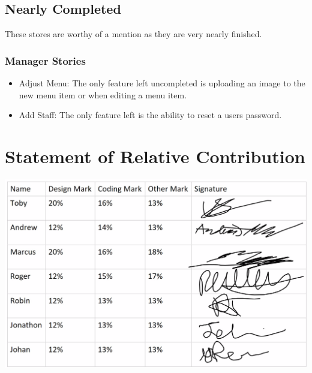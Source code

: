 \documentclass[12pt, twoside, a4paper]{report}
\begin{document}
\section*{Nearly Completed}
These stores are worthy of a mention as they are very nearly finished.

\subsection*{Manager Stories}
\begin{itemize}
  \item Adjust Menu:
    The only feature left uncompleted is uploading an image to the new menu item or when editing a menu item.
  \item Add Staff:
    The only feature left is the ability to reset a users password.
\end{itemize}

\chapter*{Statement of Relative Contribution}
\includegraphics[width=15cm]{StateOfCont.png}
\end{document}
